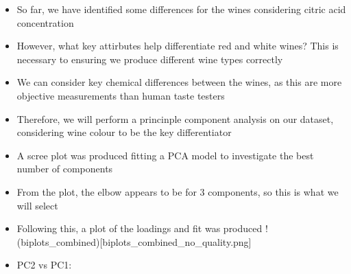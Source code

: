 \documentclass[
]{article}
\providecommand{\tightlist}{%
  \setlength{\itemsep}{0pt}\setlength{\parskip}{0pt}}
\begin{document}
\begin{itemize}
\tightlist
\item
  So far, we have identified some differences for the wines considering
  citric acid concentration
\item
  However, what key attirbutes help differentiate red and white wines?
  This is necessary to ensuring we produce different wine types
  correctly
\item
  We can consider key chemical differences between the wines, as this
  are more objective measurements than human taste testers
\item
  Therefore, we will perform a princinple component analysis on our
  dataset, considering wine colour to be the key differentiator
\item
  A scree plot was produced fitting a PCA model to investigate the best
  number of components
\item
  From the plot, the elbow appears to be for 3 components, so this is
  what we will select
\item
  Following this, a plot of the loadings and fit was produced
  !(biplots\_combined){[}biplots\_combined\_no\_quality.png{]}
\item
  PC2 vs PC1:


\end{itemize}
\end{document}
